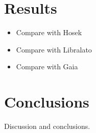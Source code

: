 \documentclass{aa} %
\begin{document}
%	
	
	
	\section{Results}
  \begin{itemize}
  	\item Compare with Hosek
  	\item Compare with Libralato
  	\item Compare with Gaia
  \end{itemize}
	
	\section{Conclusions}
	Discussion and conclusions.
	
	
	
\end{document}

